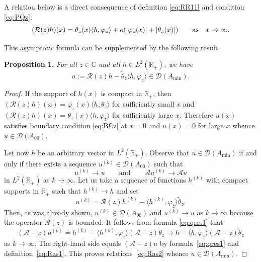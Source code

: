 \documentclass[10pt,a4paper]{amsart}
\numberwithin{equation}{section}
\newtheorem{Proposition}[Theorem]{Proposition}
 { \theoremstyle{definition}
\newtheorem{Remark}[Theorem]{Remark} }
\begin{document}
A relation below is a direct consequence of definition \eqref{eq:RR11}
 and condition \eqref{eq:PQz}:
 \[
 ( {\mathcal R} (z)h) (x) = \theta_{z} (x) \langle h, \varphi_{\bar{z}} \rangle+ o(|\varphi_{z} (x)| +|\theta_{z} (x)| )\qquad {\rm as}\quad x\to\infty.
 \]

 This asymptotic formula can be supplemented by the following result.

 \begin{Proposition}\label{AS}
 For all $z\in {\mathbb C}$ and all $h\in L^2 ({\mathbb R}_{+})$, we have
 \begin{equation}
 u:= {\mathcal R} (z)h - \tilde{\theta}_{z} \langle h, \varphi_{ \bar{z}} \rangle\in {\mathcal D}(A_{\min}).
 \label{eq:Ras1}\end{equation}
 \end{Proposition}

\begin{proof}
If the support of $h(x)$ is compact in ${\mathbb R}_{+}$, then $ ( {\mathcal R} (z)h) (x) = \varphi_{z}(x) \langle h, \theta_{\bar{z}} \rangle$ for sufficiently small $x$ and $ ( {\mathcal R} (z)h) (x) = \theta_{z}(x) \langle h, \varphi_{\bar{z}} \rangle$ for sufficiently large $x$. Therefore $u(x)$ satisfies boundary condition \eqref{eq:BCz} at $x=0$ and $u(x)=0$ for large $x$ whence $u\in{\mathcal D}(A_{00})$.

Let now $h$ be an arbitrary vector in $L^2 ({\mathbb R}_{+})$. Observe that $ u \in {\mathcal D}(A_{\min})$ if and only if there exists a sequence $u^{(k)}\in {\mathcal D}(A_{00})$ such that
 \begin{equation}
u^{(k)}\to u \qquad \mbox{and} \qquad {\mathcal A}u^{(k)}\to {\mathcal A}u
 \label{eq:Ras2}\end{equation}
 in $L^2 ({\mathbb R}_{+})$ as $ k\to\infty$.
 Let us take a sequence of functions $h^{(k)} $ with compact supports in ${\mathbb R}_{+}$
 such that $h^{(k)}\to h$ and set
 \[
 u^{(k)}= {\mathcal R} (z)h^{(k)} - \big \langle h^{(k)}, \varphi_{\bar{z}} \big\rangle \tilde{\theta}_{z} .
 \]
 Then, as was already shown, $u^{(k)} \in {\mathcal D} (A_{00})$ and $u^{(k)}\to u$ as $k\to\infty$ because the operator $ {\mathcal R} (z)$ is bounded. It follows from formula \eqref{eq:qres1} that
 \[
({\mathcal A} -z) u^{(k)}= h^{(k)} - \big\langle h^{(k)}, \varphi_{\bar{z}} \big\rangle ({\mathcal A} -z) \tilde{\theta}_{z} \to h - \langle h, \varphi_{\bar{z}} \rangle ({\mathcal A} -z) \tilde{\theta}_{z}
\]
as $k\to\infty$. The right-hand side equals $({\mathcal A} -z) u$ by formula~\eqref{eq:qres1} and definition~\eqref{eq:Ras1}. This proves relations~\eqref{eq:Ras2} whence $u\in {\mathcal D}(A_{\min})$.
 \end{proof}
\end{document}
